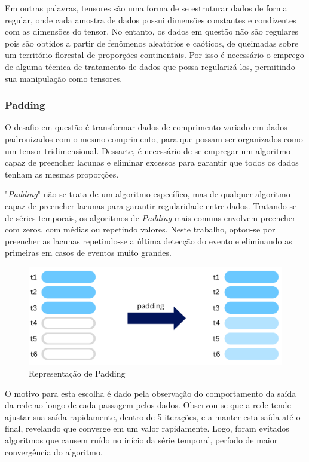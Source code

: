 Em outras palavras, tensores são uma forma de se estruturar dados de forma regular, onde cada amostra de dados possui dimensões constantes e condizentes com as dimensões do tensor. No entanto, os dados em questão não são regulares pois são obtidos a partir de fenômenos aleatórios e caóticos, de queimadas sobre um território florestal de proporções continentais. Por isso é necessário o emprego de alguma técnica de tratamento de dados que possa regularizá-los, permitindo sua manipulação como tensores.

\subsubsection{Padding}

O desafio em questão é transformar dados de comprimento variado em dados padronizados com o mesmo comprimento, para que possam ser organizados como um tensor tridimensional. Dessarte, é necessário de se empregar um algoritmo capaz de preencher lacunas e eliminar excessos para garantir que todos os dados tenham as mesmas proporções.

"\textit{Padding}" não se trata de um algoritmo específico, mas de qualquer algoritmo capaz de preencher lacunas para garantir regularidade entre dados. Tratando-se de séries temporais, os algoritmos de \textit{Padding} mais comuns envolvem preencher com zeros, com médias ou repetindo valores. Neste trabalho, optou-se por preencher as lacunas repetindo-se a última detecção do evento e eliminando as primeiras em casos de eventos muito grandes. 

\begin{figure}[ht]
    \centering
    \includegraphics[scale=0.5]{tg1/figuras/padding.png}
    \caption{Representação de Padding}
    \label{fig:padding}
\end{figure}


O motivo para esta escolha é dado pela observação do comportamento da saída da rede ao longo de cada passagem pelos dados. Observou-se que a rede tende ajustar sua saída rapidamente, dentro de 5 iterações, e a manter esta saída até o final, revelando que converge em um valor rapidamente. Logo, foram evitados algoritmos que causem ruído no início da série temporal, período de maior convergência do algoritmo.

